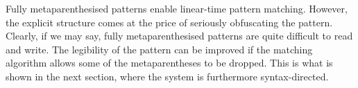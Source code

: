 Fully meta\-parenthesised patterns enable linear\hyp{}time pattern
matching. However, the explicit structure comes at the price of
seriously obfuscating the pattern. Clearly, if we may say, fully
meta\-parenthesised patterns are quite difficult to read and
write. The legibility of the pattern can be improved if the matching
algorithm allows some of the meta\-parentheses to be dropped. This is
what is shown in the next section, where the system is furthermore
syntax\hyp{}directed.





